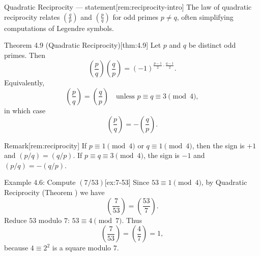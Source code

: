 \documentclass[10pt]{article}
\theoremstyle{definition}
\theoremstyle{plain}
\numberwithin{equation}{section}
\begin{document}
\bigskip

\begin{define}{Quadratic Reciprocity — statement}[rem:reciprocity-intro]
The law of quadratic reciprocity relates $(\tfrac{q}{p})$ and $(\tfrac{p}{q})$ for odd primes $p\neq q$,
often simplifying computations of Legendre symbols.
\end{define}

\begin{define}{Theorem 4.9 (Quadratic Reciprocity)}[thm:4.9]
Let $p$ and $q$ be distinct odd primes. Then
\[
\left(\frac{p}{q}\right)\left(\frac{q}{p}\right)=(-1)^{\frac{p-1}{2}\cdot\frac{q-1}{2}}.
\]
Equivalently,
\[
\left(\frac{p}{q}\right)=\left(\frac{q}{p}\right)\quad\text{unless }p\equiv q\equiv 3\pmod 4,
\]
in which case
\[
\left(\frac{p}{q}\right)=-\left(\frac{q}{p}\right).
\]
\end{define}

\begin{define}{Remark}[rem:reciprocity]
If $p\equiv 1\pmod4$ or $q\equiv 1\pmod4$, then the sign is $+1$ and $(p/q)=(q/p)$.
If $p\equiv q\equiv 3\pmod4$, the sign is $-1$ and $(p/q)=- (q/p)$.
\end{define}

\begin{define}{Example 4.6: Compute $(7/53)$}[ex:7-53]
Since $53\equiv 1\pmod 4$, by Quadratic Reciprocity (Theorem ) we have
\[
\left(\frac{7}{53}\right)=\left(\frac{53}{7}\right).
\]
Reduce $53$ modulo $7$: $53\equiv 4\pmod 7$. Thus
\[
\left(\frac{7}{53}\right)=\left(\frac{4}{7}\right)=1,
\]
because $4\equiv 2^2$ is a square modulo $7$.
\end{define}

\bigskip
\end{document}
